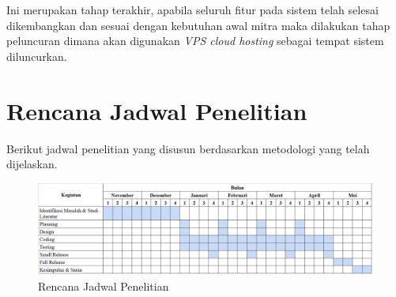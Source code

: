     Ini merupakan tahap terakhir, apabila seluruh fitur pada sistem telah selesai dikembangkan dan sesuai dengan kebutuhan awal mitra maka dilakukan tahap peluncuran dimana akan digunakan \textit{VPS cloud hosting} sebagai tempat sistem diluncurkan.

\newpage

\section{Rencana Jadwal Penelitian}

Berikut jadwal penelitian yang disusun berdasarkan metodologi yang telah dijelaskan.

\begin{figure}[!h]
    \includegraphics[width=1.2\linewidth, center]{images/metode/schedule.png}
    \caption{Rencana Jadwal Penelitian}
    \label{fig:flow-schedule}
\end{figure}